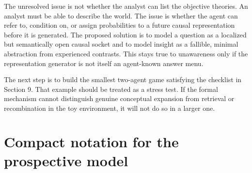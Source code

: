 \documentclass[11pt]{article}
\begin{document}
	The unresolved issue is not whether the analyst can list the objective theories.  An analyst must be able to describe the world.  The issue is whether the agent can refer to, condition on, or assign probabilities to a future causal representation before it is generated.  The proposed solution is to model a question as a localized but semantically open causal socket and to model insight as a fallible, minimal abstraction from experienced contrasts.  This stays true to unawareness only if the representation generator is not itself an agent-known answer menu.
	
	The next step is to build the smallest two-agent game satisfying the checklist in Section 9.  That example should be treated as a stress test.  If the formal mechanism cannot distinguish genuine conceptual expansion from retrieval or recombination in the toy environment, it will not do so in a larger one.
	
	\appendix
	
	\section{Compact notation for the prospective model}
	
\end{document}
